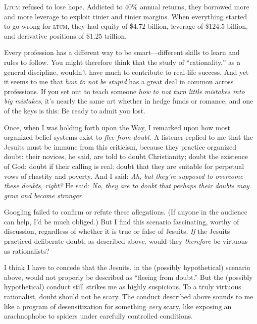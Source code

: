 {
\textsc{Ltcm} refused to lose hope. Addicted to 40\% annual returns, they
borrowed more and more leverage to exploit tinier and tinier margins.
When everything started to go wrong for \textsc{ltcm}, they had equity of \$4.72
billion, leverage of \$124.5 billion, and derivative positions of
\$1.25 trillion.}

{
 Every profession has a different way to be smart---different
skills to learn and rules to follow. You might therefore think that the
study of ``rationality,'' as a
general discipline, wouldn't have much to contribute to
real-life success. And yet it seems to me that \textit{how to not be
stupid} has a great deal in common across professions. If you set out
to teach someone \textit{how to not turn little mistakes into big
mistakes}, it's nearly the same art whether in hedge
funds or romance, and one of the keys is this: Be ready to admit you
lost.}

\myendsectiontext


{
 Once, when I was holding forth upon the Way, I remarked upon how
most organized belief systems exist to \textit{flee from doubt.} A
listener replied to me that the Jesuits must be immune from this
criticism, because they practice organized doubt: their novices, he
said, are told to doubt Christianity; doubt the existence of God; doubt
if their calling is real; doubt that they are suitable for perpetual
vows of chastity and poverty. And I said: \textit{Ah, but
they're supposed to overcome these doubts, right?} He
said: \textit{No, they are to doubt that perhaps their doubts may grow
and become stronger.} }

{
 Googling failed to confirm or refute these allegations. (If anyone
in the audience can help, I'd be much obliged.) But I
find this scenario fascinating, worthy of discussion, regardless of
whether it is true or false of Jesuits. \textit{If} the Jesuits
practiced deliberate doubt, as described above, would they
\textit{therefore} be virtuous as rationalists?}

{
 I think I have to concede that the Jesuits, in the (possibly
hypothetical) scenario above, would not properly be described as
``fleeing from doubt.'' But the
(possibly hypothetical) conduct still strikes me as highly suspicious.
To a truly virtuous rationalist, doubt should not be scary. The conduct
described above sounds to me like a program of desensitization for
something \textit{very} scary, like exposing an arachnophobe to spiders
under carefully controlled conditions.}

